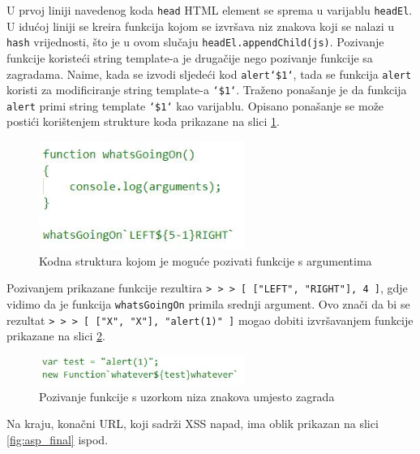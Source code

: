 \documentclass[12pt, oneside, onecolumn]{book}
\begin{document}
{U prvoj liniji navedenog koda \texttt{head} HTML element se sprema u varijablu \texttt{headEl}. U idućoj liniji se kreira funkcija kojom se izvršava niz znakova koji se nalazi u \texttt{hash} vrijednosti, što je u ovom slučaju \texttt{headEl.appendChild(js)}. Pozivanje funkcije koristeći string template-a je drugačije nego pozivanje funkcije sa zagradama. Naime, kada se izvodi sljedeći kod \texttt{alert`\${1}`}, tada se funkcija \texttt{alert} koristi za modificiranje string template-a \texttt{`\${1}`}. Traženo ponašanje je da funkcija \texttt{alert} primi string template \texttt{`\${1}`} kao varijablu. Opisano ponašanje se može postići korištenjem strukture koda prikazane na slici \ref{fig:asp_nf}.

\begin{figure}[H]
	\begin{center}
		\includegraphics[width=0.6\textwidth]{asp_nf.jpg}
		\caption{Kodna struktura kojom je moguće pozivati funkcije s argumentima} \label{fig:asp_nf}
	\end{center}
\end{figure}

Pozivanjem prikazane funkcije rezultira \texttt{> > > [ ["LEFT", "RIGHT"], 4 ]}, gdje vidimo da je funkcija \texttt{whatsGoingOn} primila srednji argument. Ovo znači da bi se rezultat \texttt{> > > [ ["X", "X"], "alert(1)" ]} mogao dobiti izvršavanjem funkcije prikazane na slici \ref{fig:asp_funf}.

\begin{figure}[H]
	\begin{center}
		\includegraphics[width=0.6\textwidth]{asp_funf.jpg}
		\caption{Pozivanje funkcije s uzorkom niza znakova umjesto zagrada} \label{fig:asp_funf}
	\end{center}
\end{figure}

Na kraju, konačni URL, koji sadrži XSS napad, ima oblik prikazan na slici \ref{fig:asp_final} ispod.

}
\end{document}
